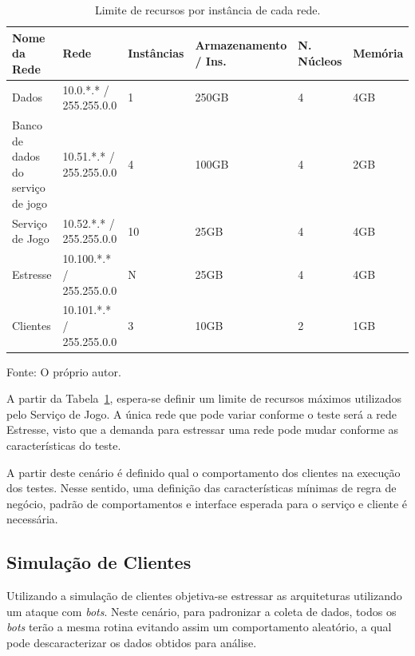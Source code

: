 \begin{table}[htb!]
\centering
\begin{adjustbox}{max width=\textwidth}
\caption{Limite de recursos por instância de cada rede.}
\label{tab:limite_recursos}
\begin{tabular}{|l|l|l|l|l|l|}
\hline
Nome da Rede                      & Rede                     & Instâncias & Armazenamento / Ins. & N. Núcleos & Memória \\ \hline
Dados                             & 10.0.*.* / 255.255.0.0   & 1          & 250GB                & 4          & 4GB     \\ \hline
Banco de dados do serviço de jogo & 10.51.*.* / 255.255.0.0  & 4          & 100GB                & 4          & 2GB     \\ \hline
Serviço de Jogo                   & 10.52.*.* / 255.255.0.0  & 10         & 25GB                 & 4          & 4GB     \\ \hline
Estresse                          & 10.100.*.* / 255.255.0.0 & N          & 25GB                 & 4          & 4GB     \\ \hline
Clientes                          & 10.101.*.* / 255.255.0.0 & 3          & 10GB                 & 2          & 1GB     \\ \hline
\end{tabular}
\end{adjustbox}

Fonte: O próprio autor.
\end{table}

A partir da Tabela~\ref{tab:limite_recursos}, espera-se definir um limite de recursos máximos utilizados pelo Serviço de Jogo.
%
A única rede que pode variar conforme o teste será a rede Estresse, visto que a demanda para estressar uma rede pode mudar conforme as características do teste.

A partir deste cenário é definido qual o comportamento dos clientes na execução dos testes.
%
Nesse sentido, uma definição das características mínimas de regra de negócio, padrão de comportamentos e interface esperada para o serviço e cliente é necessária.



\subsection{Simulação de Clientes}
\label{sec:SimulaCliente}



Utilizando a simulação de clientes objetiva-se estressar as arquiteturas utilizando um ataque com \textit{bots}.
%
Neste cenário, para padronizar a coleta de dados, todos os \textit{bots} terão a mesma rotina evitando assim um comportamento aleatório, a qual pode descaracterizar os dados obtidos para análise.



